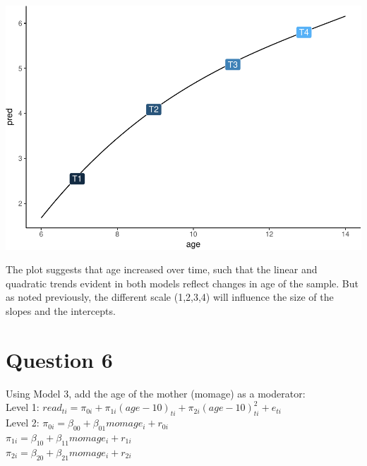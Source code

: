 \documentclass[]{article}
\begin{document}
\includegraphics{Beck_HW_6_R_2_files/figure-latex/unnamed-chunk-8-1.pdf}

The plot suggests that age increased over time, such that the linear and
quadratic trends evident in both models reflect changes in age of the
sample. But as noted previously, the different scale (1,2,3,4) will
influence the size of the slopes and the intercepts.

\section{Question 6}\label{question-6}

Using Model 3, add the age of the mother (momage) as a moderator:\\
Level 1:
\(read_{ti} = \pi_{0i} + \pi_{1i}(age-10)_{ti} + \pi_{2i}(age-10)^2_{ti} + e_{ti}\)\\
Level 2: \(\pi_{0i} = \beta_{00} + \beta_{01}momage_i + r_{0i}\)\\
\(\pi_{1i} = \beta_{10} + \beta_{11}momage_i + r_{1i}\)\\
\(\pi_{2i} = \beta_{20} + \beta_{21}momage_i + r_{2i}\)
\end{document}
